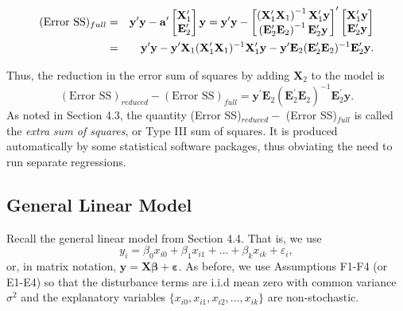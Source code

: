 \begin{center}
\begin{eqnarray} \label{E4:OVErrorSS}
(\text{Error SS})_{full}&=& \mathbf{y}^{\prime} \mathbf{y} -
\mathbf{a}^{\prime}
\begin{bmatrix}
\mathbf{X}_1^{\prime } \\ \mathbf{E}_2^{\prime}
\end{bmatrix} \mathbf{y} = \mathbf{y}^{\prime}\mathbf{y} -
\begin{bmatrix} \notag
\left( \mathbf{X}_1^{\prime} \mathbf{X}_1 \right)^{-1}
\mathbf{X}_1^{\prime} \mathbf{y} \\
\left( \mathbf{E}_2^{\prime}\mathbf{E}_2\right) ^{-1}
\mathbf{E}_2^{\prime} \mathbf{y}
\end{bmatrix}
^{\prime}
\begin{bmatrix} \notag
\mathbf{X}_1^{\prime} \mathbf{y} \\
\mathbf{E}_2^{\prime}\mathbf{y}
\end{bmatrix}
\\
&=& \mathbf{y}^{\prime} \mathbf{y} - \mathbf{y}^{\prime}
\mathbf{X}_1 (\mathbf{X}_1^{\prime} \mathbf{X}_1)^{-1}
\mathbf{X}_1^{\prime} \mathbf{y} - \mathbf{y}^{\prime} \mathbf{E}_2
(\mathbf{E}_2^{\prime} \mathbf{E}_2)^{-1} \mathbf{E}_2^{\prime}
\mathbf{y}.
\end{eqnarray}
\end{center}
Thus, the reduction in the error sum of squares by adding
$\mathbf{X}_2$ to the model is
\begin{equation}\label{E4:ESSReduction}
(\text{Error SS})_{reduced}-(\text{Error
SS})_{full}=\mathbf{y}^{\prime} \mathbf{E}_2 (\mathbf{E}_2^{\prime}
\mathbf{E}_2)^{-1} \mathbf{E}_2^{\prime} \mathbf{y} .
\end{equation}
As noted in Section 4.3, the quantity (Error SS)$_{reduced}-$ (Error
SS)$_{full}$ is called the \textit{extra sum of squares}, or Type
III sum of squares. It is produced automatically by some statistical
software packages, thus obviating the need to run separate
regressions.



\subsection{General Linear Model}\label{S4:GeneralLinearModel}

Recall the general linear model from Section 4.4. That is, we use
\begin{equation*}
y_i = \beta_0 x_{i0} + \beta_1 x_{i1} + \ldots + \beta _k x_{ik} +
\varepsilon_i,
\end{equation*}
\noindent or, in matrix notation, $ \mathbf{y=X \boldsymbol \beta +
\boldsymbol \varepsilon.}$ As before, we use Assumptions F1-F4 (or E1-E4) so that
the disturbance terms are i.i.d mean zero with common variance $\sigma^2$ and the explanatory variables
$\{x_{i0},x_{i1},x_{i2},\ldots,x_{ik}\}$ are non-stochastic.

